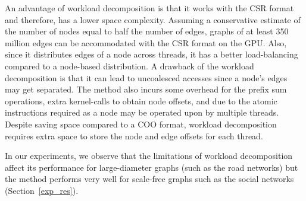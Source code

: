 
An advantage of workload decomposition is that it works with the CSR format and therefore, has a lower space complexity.
Assuming a conservative estimate of the number of nodes equal to half the number of edges, graphs of at least 350 million edges can be accommodated with the CSR format on the GPU.  
Also, since it distributes edges of a node across threads, it has a better load-balancing compared to a node-based distribution.
A drawback of the workload decomposition is that it can lead to uncoalesced accesses since a node's edges may get separated.
The method also incurs some overhead for the prefix sum operations, extra kernel-calls to obtain node offsets, and due to the atomic instructions required as a node may be operated upon by multiple threads.
Despite saving space compared to a COO format, workload decomposition requires extra space to store the node and edge offsets for each thread.

In our experiments, we observe that the limitations of workload decomposition affect its performance for large-diameter graphs (such as the road networks) 
but the method performs very well for scale-free graphs such as the social networks (Section~\ref{exp_res}).


